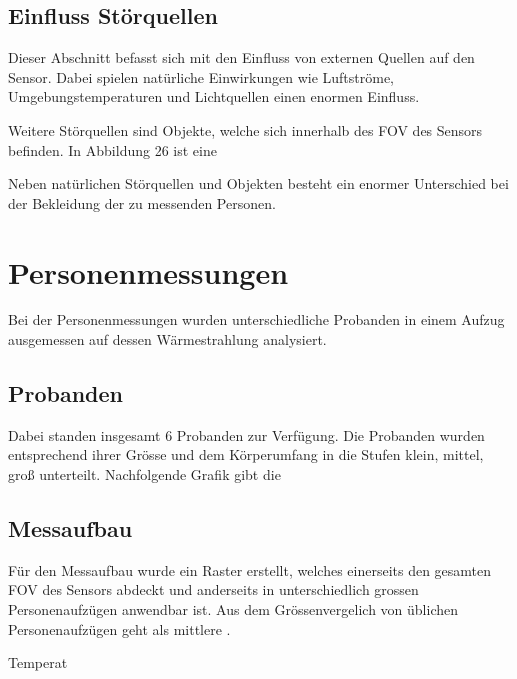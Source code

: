 \subsection{Einfluss Störquellen}

Dieser Abschnitt befasst sich mit den Einfluss von externen Quellen auf den Sensor. Dabei spielen natürliche Einwirkungen wie Luftströme, Umgebungstemperaturen und Lichtquellen einen enormen Einfluss. 



Weitere Störquellen sind Objekte, welche sich innerhalb des \ac{FOV} des Sensors befinden. In Abbildung 26 ist eine



Neben natürlichen Störquellen und Objekten besteht ein enormer Unterschied bei der Bekleidung der zu messenden Personen. 




\section{Personenmessungen}
Bei der Personenmessungen wurden unterschiedliche Probanden in einem Aufzug ausgemessen auf dessen Wärmestrahlung analysiert. 

\subsection{Probanden}
Dabei standen insgesamt 6 Probanden zur Verfügung. Die Probanden wurden entsprechend ihrer Grösse und dem Körperumfang in die Stufen klein, mittel, groß unterteilt. Nachfolgende Grafik gibt die 

\subsection{Messaufbau}

Für den Messaufbau wurde ein Raster erstellt, welches einerseits den gesamten \ac{FOV} des Sensors abdeckt und anderseits in unterschiedlich grossen Personenaufzügen anwendbar ist. Aus dem Grössenvergelich von üblichen Personenaufzügen geht als mittlere .



Temperat


